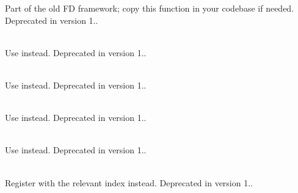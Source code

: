 \begin{DoxyRefList}
\label{deprecated__deprecated000114}%
%
Part of the old FD framework; copy this function in your codebase if needed. Deprecated in version 1..  
\item[Member \doxylink{class_quant_lib_1_1_index_manager_aed0131e372bbb1b28589d8db8abe9f9c}{Quant\+Lib\+::Index\+Manager\+::clear\+History} (const std\+::string \&name)]\hfill \\
\label{deprecated__deprecated000088}%
%
Use  instead. Deprecated in version 1..  
\item[Member \doxylink{class_quant_lib_1_1_index_manager_a3f97171cf7bdb7925257dc0943af9cc4}{Quant\+Lib\+::Index\+Manager\+::get\+History} (const std\+::string \&name) const]\hfill \\
\label{deprecated__deprecated000087}%
%
Use  instead. Deprecated in version 1..  
\item[Member \doxylink{class_quant_lib_1_1_index_manager_a894f51198b68149af6fabcf43492e977}{Quant\+Lib\+::Index\+Manager\+::has\+Historical\+Fixing} (const std\+::string \&name, const \doxylink{class_quant_lib_1_1_date}{Date} \&fixing\+Date) const]\hfill \\
\label{deprecated__deprecated000089}%
%
Use  instead. Deprecated in version 1..  
\item[Member \doxylink{class_quant_lib_1_1_index_manager_abd559a3b1bc2aed558b51c5908901432}{Quant\+Lib\+::Index\+Manager\+::has\+History} (const std\+::string \&name) const]\hfill \\
\label{deprecated__deprecated000086}%
%
Use  instead. Deprecated in version 1..  
\item[Member \doxylink{class_quant_lib_1_1_index_manager_a0bb6d151320a984c4dcaec76675a6fad}{Quant\+Lib\+::Index\+Manager\+::notifier} (const std\+::string \&name) const]\hfill \\
\label{deprecated__deprecated000091}%
%
Register with the relevant index instead. Deprecated in version 1..  

\end{DoxyRefList}
